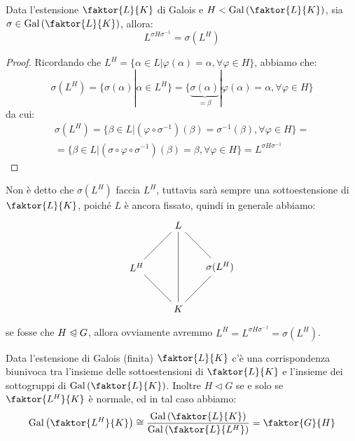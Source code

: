 \documentclass[11pt]{scrartcl}
\begin{document}
\begin{lemma}
    \label{3.67}
    Data l'estensione $\faktor{L}{K}$ di Galois e $H < \Gal\left(\faktor{L}{K}\right)$, sia $\sigma \in \Gal\left(\faktor{L}{K}\right)$, allora:
    \[ L^{\sigma H \sigma^{-1}} = \sigma(L^H)
        \]
\end{lemma}

\begin{proof}
    Ricordando che $L^H = \{\alpha \in L | \varphi(\alpha) = \alpha, \forall \varphi \in H\}$, abbiamo che:
\[ \sigma(L^H) = \{\sigma(\alpha) | \alpha \in L^H\} = \{\underbrace{\sigma(\alpha)}_{= \beta} | \varphi(\alpha) = \alpha, \forall \varphi \in H\}
        \]
da cui:
\begin{multline*}
    \sigma(L^H) = \{\beta \in L | (\varphi \circ \sigma^{-1})(\beta) = \sigma^{-1}(\beta), \forall \varphi \in H\} = \\ 
    = \{\beta \in L | (\sigma \circ \varphi \circ \sigma^{-1})(\beta) = \beta, \forall \varphi \in H\} = L^{\sigma H \sigma^{-1}}
\end{multline*}
\end{proof}

\begin{remark}
    \label{3.68}
    Non è detto che $\sigma(L^H)$ faccia $L^H$, tuttavia sarà sempre una sottoestensione di $\faktor{L}{K}$, poiché $L$ è ancora fissato,
    quindi in generale abbiamo:
    \[\begin{tikzpicture}
        \node (Q1) at (0,0) {$K$};
        \node (Q2) at (1.5,1.5) {$\sigma(L^H)$};
        \node (Q3) at (0,3) {$L$};
        \node (Q4) at (-1.5,1.5) {$L^H$};
        \draw (Q1)--(Q2) node [pos=0.7, below,inner sep=0.25cm] {};
        \draw (Q1)--(Q4) node [pos=0.7, below,inner sep=0.25cm] {};
        \draw (Q3)--(Q4) node [pos=0.7, above] {};
        \draw (Q2)--(Q3) node [pos=0.3, above] {};
        \draw (Q1)--(Q3) node [pos=0.7, below, right,inner sep=0.25cm, yshift=-0.4cm] {};
        \end{tikzpicture}
        \]
    se fosse che $H \trianglelefteqslant G$, allora ovviamente avremmo $L^H = L^{\sigma H \sigma^{-1}} = \sigma(L^H)$.
\end{remark}

\begin{theorem}
    \label{corrG}
    Data l'estensione di Galois (finita) $\faktor{L}{K}$ c'è una corrispondenza biunivoca tra l'insieme delle sottoestensioni di $\faktor{L}{K}$ e l'insieme dei sottogruppi di $\Gal\left(\faktor{L}{K}\right)$. Inoltre $H \triangleleft G$ se e solo se 
    $\faktor{L^H}{K}$ è normale, ed in tal caso abbiamo:
    \[ \Gal\left(\faktor{L^H}{K}\right) \cong \frac{\Gal\left(\faktor{L}{K}\right)}{\Gal\left(\faktor{L}{L^H}\right)} = \faktor{G}{H}
        \]
\end{theorem}
\end{document}
